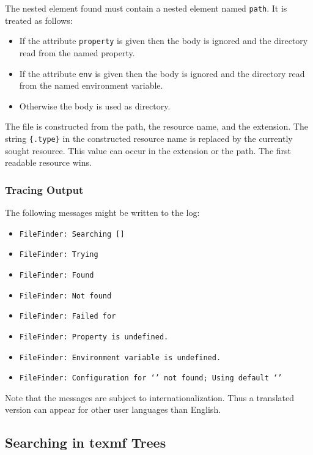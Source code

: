 The nested element found must contain a nested element named
\texttt{path}. It is treated as follows:
\begin{itemize}
\item If the attribute \texttt{property} is given then the body is
  ignored and the directory read from the named property.
\item If the attribute \texttt{env} is given then the body is ignored
  and the directory read from the named environment variable.
\item Otherwise the body is used as directory.
\end{itemize}

The file is constructed from the path, the resource name, and the
extension. The string \verb|{.type}| in the constructed resource name
is replaced by the currently sought resource. This value can occur in
the extension or the path. The first readable resource wins.

\subsubsection*{Tracing Output}

The following messages might be written to the log:

{\small
\begin{itemize}
\item{\tt FileFinder: Searching  []}
\item{\tt FileFinder: Trying }
\item{\tt FileFinder: Found }
\item{\tt FileFinder: Not found }
\item{\tt FileFinder: Failed for }
\item{\tt FileFinder: Property  is undefined.}
\item{\tt FileFinder: Environment variable  is undefined.}
\item{\tt FileFinder: Configuration for `' not found;
    Using default `'}
\end{itemize}}

Note that the messages are subject to internationalization. Thus a
translated version can appear for other user languages than English.


\subsection{Searching in texmf Trees}

